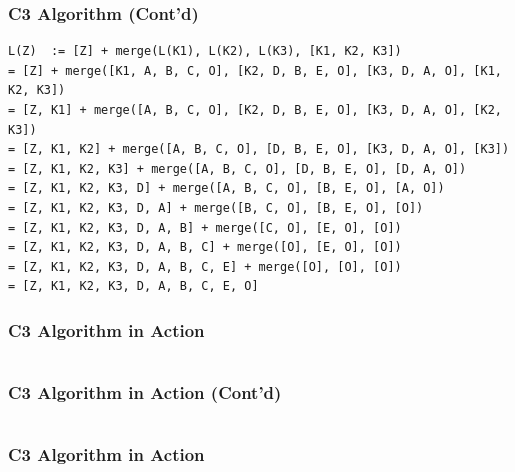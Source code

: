 \documentclass{../py-lecture}
\begin{document}
\begin{frame}[fragile]
	\frametitle{C3 Algorithm (Cont'd)}
  \begin{verbatim}
L(Z)  := [Z] + merge(L(K1), L(K2), L(K3), [K1, K2, K3])
= [Z] + merge([K1, A, B, C, O], [K2, D, B, E, O], [K3, D, A, O], [K1, K2, K3])
= [Z, K1] + merge([A, B, C, O], [K2, D, B, E, O], [K3, D, A, O], [K2, K3])
= [Z, K1, K2] + merge([A, B, C, O], [D, B, E, O], [K3, D, A, O], [K3])
= [Z, K1, K2, K3] + merge([A, B, C, O], [D, B, E, O], [D, A, O])
= [Z, K1, K2, K3, D] + merge([A, B, C, O], [B, E, O], [A, O])
= [Z, K1, K2, K3, D, A] + merge([B, C, O], [B, E, O], [O])
= [Z, K1, K2, K3, D, A, B] + merge([C, O], [E, O], [O])
= [Z, K1, K2, K3, D, A, B, C] + merge([O], [E, O], [O])
= [Z, K1, K2, K3, D, A, B, C, E] + merge([O], [O], [O])
= [Z, K1, K2, K3, D, A, B, C, E, O]
  \end{verbatim}
\end{frame}

\begin{frame}[fragile]
	\frametitle{C3 Algorithm in Action}
  \inputminted[bgcolor=Black,fontsize=\scriptsize,lastline=20]{python}{./src/mro.py}
\end{frame}

\begin{frame}[fragile]
	\frametitle{C3 Algorithm in Action (Cont'd)}
  \inputminted[bgcolor=Black,fontsize=\scriptsize,firstline=22,lastline=30]{python}{./src/mro.py}
\end{frame}

\begin{frame}[fragile]
	\frametitle{C3 Algorithm in Action}
  \inputminted[bgcolor=Black,fontsize=\scriptsize,firstline=32]{python}{./src/mro.py}
\end{frame}
\end{document}
